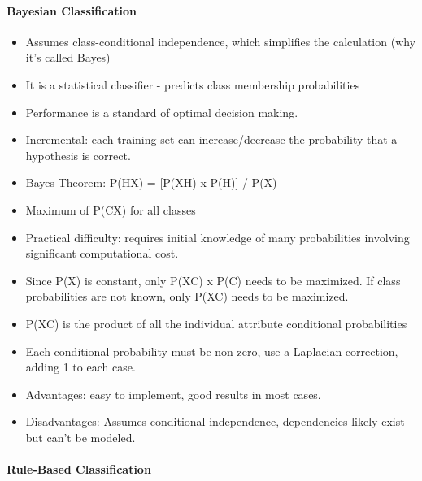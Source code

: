 \documentclass[11pt]{article}
\providecommand{\tightlist}{%
      \setlength{\itemsep}{0pt}\setlength{\parskip}{0pt}}
\begin{document}
    \paragraph{Bayesian Classification}\label{bayesian-classification}

    \begin{itemize}
\tightlist
\item
  Assumes class-conditional independence, which simplifies the
  calculation (why it's called Bayes)
\item
  It is a statistical classifier - predicts class membership
  probabilities
\item
  Performance is a standard of optimal decision making.
\item
  Incremental: each training set can increase/decrease the probability
  that a hypothesis is correct.
\end{itemize}

    \begin{itemize}
\tightlist
\item
  Bayes Theorem: P(H\textbar{}X) = {[}P(X\textbar{}H) x P(H){]} / P(X)
\item
  Maximum of P(C\textbar{}X) for all classes
\item
  Practical difficulty: requires initial knowledge of many probabilities
  involving significant computational cost.
\end{itemize}

    \begin{itemize}
\tightlist
\item
  Since P(X) is constant, only P(X\textbar{}C) x P(C) needs to be
  maximized. If class probabilities are not known, only P(X\textbar{}C)
  needs to be maximized.
\item
  P(X\textbar{}C) is the product of all the individual attribute
  conditional probabilities
\item
  Each conditional probability must be non-zero, use a Laplacian
  correction, adding 1 to each case.
\end{itemize}

    \begin{itemize}
\tightlist
\item
  Advantages: easy to implement, good results in most cases.
\item
  Disadvantages: Assumes conditional independence, dependencies likely
  exist but can't be modeled.
\end{itemize}

    \paragraph{Rule-Based Classification}\label{rule-based-classification}
\end{document}
